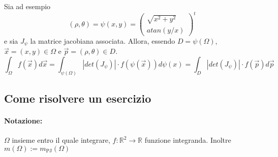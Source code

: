 \documentclass[a4paper,12pt]{book}
\begin{document}
Sia ad esempio $$(\rho, \theta) = \psi(x, y) = \left(\begin{matrix}\sqrt{x^2+y^2} \\ atan(y/x)\end{matrix}\right)^t$$
e sia $J_\psi$ la matrice jacobiana associata.
Allora, essendo $D=\psi(\Omega)$,\\ $\vec{x} = (x, y) \in \Omega$ e $\vec{p} = (\rho, \theta) \in D$.
$$ \int_\Omega f(\vec{x}) d\vec{x} = \int_{\psi(\Omega)} |det(J_\psi)|\cdot f(\psi(\vec{x})) d\psi(x) = \int_D |det(J_\psi)|\cdot f(\vec{p})d\vec{p} $$

\subsection{Come risolvere un esercizio}
\paragraph{Notazione:}
$\Omega$ insieme entro il quale integrare, $f:\mathbb{R}^2\rightarrow\mathbb{R}$ funzione integranda.
Inoltre $m(\Omega) := m_{\mathrm{PJ}}(\Omega)$
\end{document}

